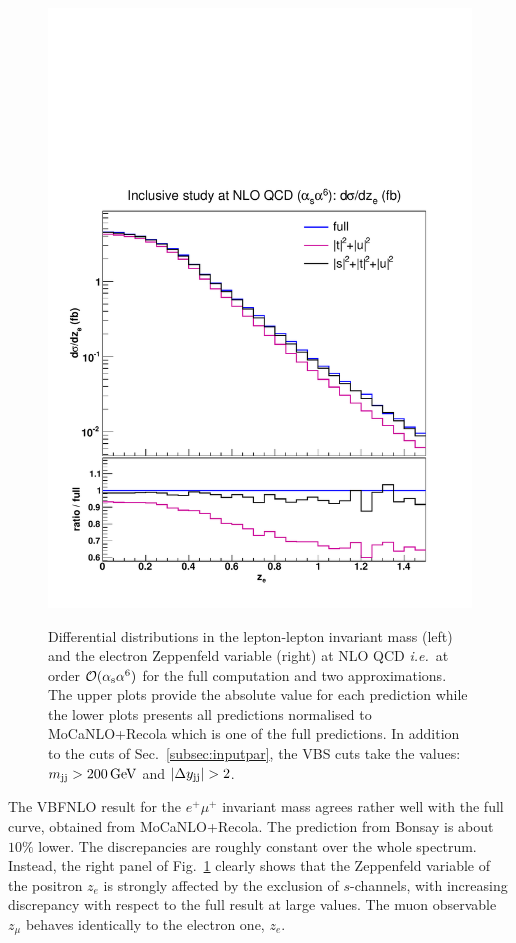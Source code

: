 \begin{figure}[hbt]
{\includegraphics[scale=0.35]{figures/scanfigures/zel_nlo.pdf}}
\caption{Differential distributions in the lepton-lepton invariant mass (left) and the electron Zeppenfeld variable (right) at NLO QCD \emph{i.e.}\ at order $\mathcal{O}(\alpha_\text{s}\alpha^6)$ for the full computation and two approximations.
The upper plots provide the absolute value for each prediction while the lower plots presents all predictions normalised to {\sc MoCaNLO}+{\sc Recola} which is one of the full predictions.
In addition to the cuts of Sec.~\ref{subsec:inputpar}, the VBS cuts take the values: $m_{\text{j}\text{j}}>200 \,\text{GeV}$ and $|\Delta y_{\Pj\Pj}|>2$.} 
\label{fig:mjjdyjj_1d_3}
\end{figure}
%
The {\sc VBFNLO} result for the $e^+\mu^+$ invariant mass agrees rather well with the full curve, obtained from {\sc MoCa\-NLO+Recola}.
The prediction from {\sc Bonsay} is about $10\%$ lower.
The discrepancies are roughly constant over the whole spectrum.
Instead, the right panel of Fig.~\ref{fig:mjjdyjj_1d_3} clearly shows that the Zeppenfeld variable of the positron $z_e$ is strongly affected by the exclusion of $s$-channels, with increasing discrepancy with respect to the full result at large values.
The muon observable $z_{\mu}$ behaves identically to the electron one, $z_e$.

